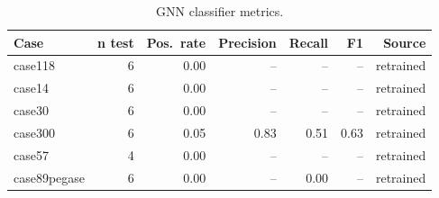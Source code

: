 \begin{table}[t]\centering
\caption{GNN classifier metrics.}
\label{tab:gnn_pr_f1}
\small
\begin{tabular}{|l|r|r|r|r|r|r|}
\hline
\textbf{Case} & \textbf{n test} & \textbf{Pos.\ rate} & \textbf{Precision} & \textbf{Recall} & \textbf{F1} & \textbf{Source} \\
\hline
case118 & 6 & 0.00 & -- & -- & -- & retrained \\
case14 & 6 & 0.00 & -- & -- & -- & retrained \\
case30 & 6 & 0.00 & -- & -- & -- & retrained \\
case300 & 6 & 0.05 & 0.83 & 0.51 & 0.63 & retrained \\
case57 & 4 & 0.00 & -- & -- & -- & retrained \\
case89pegase & 6 & 0.00 & -- & 0.00 & -- & retrained \\
\hline
\end{tabular}
\end{table}
